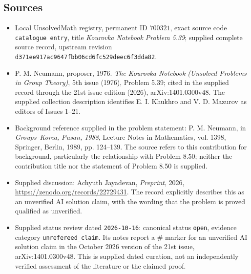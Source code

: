 \documentclass[11pt]{article}
\begin{document}
\subsection{Sources}
\begin{itemize}
\item Local UnsolvedMath registry, permanent ID \(700321\), exact source code \texttt{catalogue entry}, title \emph{Kourovka Notebook Problem 5.39}; supplied complete source record, upstream revision \texttt{d371ee917ac9647fbb06cd6fc529deec6f3dda82}.
\item P. M. Neumann, proposer, 1976. \emph{The Kourovka Notebook (Unsolved Problems in Group Theory)}, 5th issue (1976), Problem 5.39; cited in the supplied record through the 21st issue edition (2026), arXiv:1401.0300v48. The supplied collection description identifies E. I. Khukhro and V. D. Mazurov as editors of Issues 1--21.
\item Background reference supplied in the problem statement: P. M. Neumann, in \emph{Groups--Korea, Pusan, 1988}, Lecture Notes in Mathematics, vol. 1398, Springer, Berlin, 1989, pp. 124--139. The source refers to this contribution for background, particularly the relationship with Problem 8.50; neither the contribution title nor the statement of Problem 8.50 is supplied.
\item Supplied discussion: Achyuth Jayadevan, \emph{Preprint}, 2026, \url{https://zenodo.org/records/22729431}. The record explicitly describes this as an unverified AI solution claim, with the wording that the problem is proved qualified as unverified.
\item Supplied status review dated \texttt{2026-10-16}: canonical status \texttt{open}, evidence category \texttt{unrefereed\_claim}. Its notes report a \(\#\) marker for an unverified AI solution claim in the October 2026 version of the 21st issue, arXiv:1401.0300v48. This is supplied dated curation, not an independently verified assessment of the literature or the claimed proof.
\end{itemize}
\end{document}

